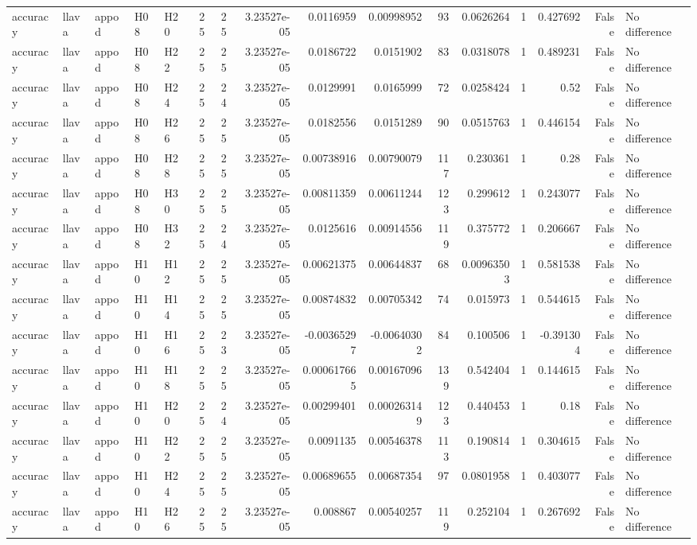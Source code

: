 \begin{longtable}{lllllrrrrrrrrrrl}
accuracy & llava & appod & H08 & H20 & 25 & 25 & 3.23527e-05 & 0.0116959 & 0.00998952 & 93 & 0.0626264 & 1 & 0.427692 & False & No difference \\
accuracy & llava & appod & H08 & H22 & 25 & 25 & 3.23527e-05 & 0.0186722 & 0.0151902 & 83 & 0.0318078 & 1 & 0.489231 & False & No difference \\
accuracy & llava & appod & H08 & H24 & 25 & 24 & 3.23527e-05 & 0.0129991 & 0.0165999 & 72 & 0.0258424 & 1 & 0.52 & False & No difference \\
accuracy & llava & appod & H08 & H26 & 25 & 25 & 3.23527e-05 & 0.0182556 & 0.0151289 & 90 & 0.0515763 & 1 & 0.446154 & False & No difference \\
accuracy & llava & appod & H08 & H28 & 25 & 25 & 3.23527e-05 & 0.00738916 & 0.00790079 & 117 & 0.230361 & 1 & 0.28 & False & No difference \\
accuracy & llava & appod & H08 & H30 & 25 & 25 & 3.23527e-05 & 0.00811359 & 0.00611244 & 123 & 0.299612 & 1 & 0.243077 & False & No difference \\
accuracy & llava & appod & H08 & H32 & 25 & 24 & 3.23527e-05 & 0.0125616 & 0.00914556 & 119 & 0.375772 & 1 & 0.206667 & False & No difference \\
accuracy & llava & appod & H10 & H12 & 25 & 25 & 3.23527e-05 & 0.00621375 & 0.00644837 & 68 & 0.00963503 & 1 & 0.581538 & False & No difference \\
accuracy & llava & appod & H10 & H14 & 25 & 25 & 3.23527e-05 & 0.00874832 & 0.00705342 & 74 & 0.015973 & 1 & 0.544615 & False & No difference \\
accuracy & llava & appod & H10 & H16 & 25 & 23 & 3.23527e-05 & -0.00365297 & -0.00640302 & 84 & 0.100506 & 1 & -0.391304 & False & No difference \\
accuracy & llava & appod & H10 & H18 & 25 & 25 & 3.23527e-05 & 0.000617665 & 0.00167096 & 139 & 0.542404 & 1 & 0.144615 & False & No difference \\
accuracy & llava & appod & H10 & H20 & 25 & 24 & 3.23527e-05 & 0.00299401 & 0.000263149 & 123 & 0.440453 & 1 & 0.18 & False & No difference \\
accuracy & llava & appod & H10 & H22 & 25 & 25 & 3.23527e-05 & 0.0091135 & 0.00546378 & 113 & 0.190814 & 1 & 0.304615 & False & No difference \\
accuracy & llava & appod & H10 & H24 & 25 & 25 & 3.23527e-05 & 0.00689655 & 0.00687354 & 97 & 0.0801958 & 1 & 0.403077 & False & No difference \\
accuracy & llava & appod & H10 & H26 & 25 & 25 & 3.23527e-05 & 0.008867 & 0.00540257 & 119 & 0.252104 & 1 & 0.267692 & False & No difference \\

\end{longtable}
